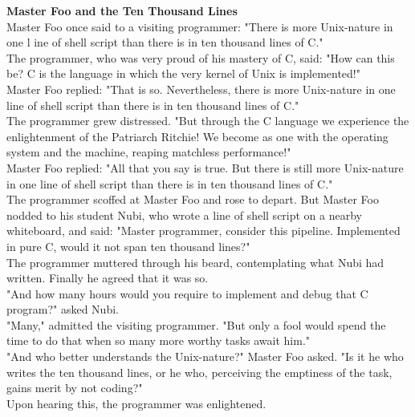 \documentclass[]{beamer} %
\begin{document}
\begin{frame}
\textbf{Master Foo and the Ten Thousand Lines}\\[4mm]
\tiny{
Master Foo once said to a visiting programmer: "There is more Unix-nature in one l
ine of shell script than there is in ten thousand lines of C."\\[2mm]
The programmer, who was very proud of his mastery of C, said: "How can this be? 
C is the language in which the very kernel of Unix is implemented!"\\[2mm]
Master Foo replied: "That is so. Nevertheless, there is more Unix-nature in one 
line of shell script than there is in ten thousand lines of C."\\[2mm]
The programmer grew distressed. "But through the C language we experience the 
enlightenment of the Patriarch Ritchie! We become as one with the operating 
system and the machine, reaping matchless performance!"\\[2mm]
Master Foo replied: "All that you say is true. But there is still more Unix-nature 
in one line of shell script than there is in ten thousand lines of C."\\[2mm]
The programmer scoffed at Master Foo and rose to depart. But Master Foo 
nodded to his student Nubi, who wrote a line of shell script on a nearby whiteboard, 
and said: "Master programmer, consider this pipeline. Implemented in pure C, would it not span ten thousand lines?"\\[2mm]
The programmer muttered through his beard, contemplating what Nubi had written. Finally he agreed that it was so.\\[2mm]
"And how many hours would you require to implement and debug that C program?" asked Nubi.\\[2mm]
"Many," admitted the visiting programmer. "But only a fool would spend the time to do 
that when so many more worthy tasks await him."\\[2mm]
"And who better understands the Unix-nature?" Master Foo asked. "Is it he who writes 
the ten thousand lines, or he who, perceiving the emptiness of the task, gains merit by not coding?"\\[2mm]
Upon hearing this, the programmer was enlightened.
}
\end{frame}
\end{document}
